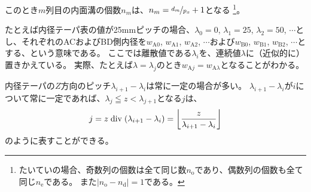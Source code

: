 このとき$m$列目の内面溝の個数$n_m$は、$n_m = \nicefrac{d_m}{p_x}+1$となる
\footnote{\label{fn:generallyDimpleN}%
たいていの場合、奇数列の個数は全て同じ数$n_\mathrm o$であり、偶数列の個数も全て同じ$n_\mathrm e$である。
また$|n_\mathrm o-n_\mathrm d| = 1$である。}。
\begin{hosoku}[label=hosoku:example4taper]
たとえば内径テーパ表の値が25mmピッチの場合、$\lambda_0=0$, $\lambda_1=25$, $\lambda_2=50$, $\cdots$とし、それぞれのACおよびBD側内径を$w_{\mathrm A0}$, $w_{\mathrm A1}$, $w_{\mathrm A2}$, $\cdots$および$w_{\mathrm B0}$, $w_{\mathrm B1}$, $w_{\mathrm B2}$, $\cdots$とする、という意味である。
ここでは離散値である$\lambda_i$を、連続値$\lambda$に（近似的に）置きかえている。
実際、たとえば$\lambda = \lambda_j$のとき$w_{\mathrm Aj} = w_{\mathrm A\lambda}$となることがわかる。
\end{hosoku}\relax
\begin{hosoku}
内径テーパの$Z$方向のピッチ$\lambda_{i+1}-\lambda_i$は常に一定の場合が多い。
$\lambda_{i+1}-\lambda_i$が$i$について常に一定であれば、$\lambda_j \leqq z < \lambda_{j+1}$となる$j$は、
\begin{align*}
  j = z \bDiv (\lambda_{i+1}-\lambda_i) = \left\lfloor\frac z{\lambda_{i+1}-\lambda_i}\right\rfloor
\end{align*}
のように表すことができる。
\end{hosoku}
